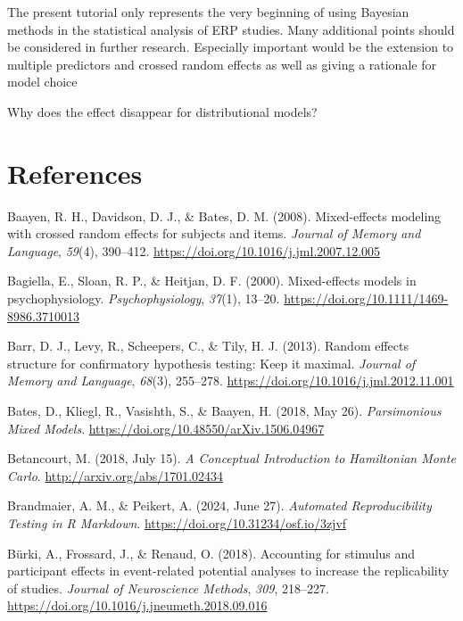 \documentclass[
  doc,12pt,floatsintext]{apa7}
\newlength{\cslhangindent}
\newenvironment{CSLReferences}[2] %
 {\begin{list}{}{%
  \setlength{\itemindent}{0pt}
  \setlength{\leftmargin}{0pt}
  \setlength{\parsep}{0pt}
  \ifodd #1
   \setlength{\leftmargin}{\cslhangindent}
   \setlength{\itemindent}{-1\cslhangindent}
  \fi
  \setlength{\itemsep}{#2\baselineskip}}}
 {\end{list}}
\begin{document}
The present tutorial only represents the very beginning of using Bayesian methods in the statistical analysis of ERP studies. Many additional points should be considered in further research. Especially important would be the extension to multiple predictors and crossed random effects as well as giving a rationale for model choice

Why does the effect disappear for distributional models?

\newpage

\section{References}\label{references}

\label{refs}
\begin{CSLReferences}{1}{0}
Baayen, R. H., Davidson, D. J., \& Bates, D. M. (2008). Mixed-effects modeling with crossed random effects for subjects and items. \emph{Journal of Memory and Language}, \emph{59}(4), 390--412. \url{https://doi.org/10.1016/j.jml.2007.12.005}

Bagiella, E., Sloan, R. P., \& Heitjan, D. F. (2000). Mixed-effects models in psychophysiology. \emph{Psychophysiology}, \emph{37}(1), 13--20. \url{https://doi.org/10.1111/1469-8986.3710013}

Barr, D. J., Levy, R., Scheepers, C., \& Tily, H. J. (2013). Random effects structure for confirmatory hypothesis testing: {Keep} it maximal. \emph{Journal of Memory and Language}, \emph{68}(3), 255--278. \url{https://doi.org/10.1016/j.jml.2012.11.001}

Bates, D., Kliegl, R., Vasishth, S., \& Baayen, H. (2018, May 26). \emph{Parsimonious {Mixed Models}}. \url{https://doi.org/10.48550/arXiv.1506.04967}

Betancourt, M. (2018, July 15). \emph{A {Conceptual Introduction} to {Hamiltonian Monte Carlo}}. \url{http://arxiv.org/abs/1701.02434}

Brandmaier, A. M., \& Peikert, A. (2024, June 27). \emph{Automated {Reproducibility Testing} in {R Markdown}}. \url{https://doi.org/10.31234/osf.io/3zjvf}

Bürki, A., Frossard, J., \& Renaud, O. (2018). Accounting for stimulus and participant effects in event-related potential analyses to increase the replicability of studies. \emph{Journal of Neuroscience Methods}, \emph{309}, 218--227. \url{https://doi.org/10.1016/j.jneumeth.2018.09.016}


\end{CSLReferences}
\end{document}
